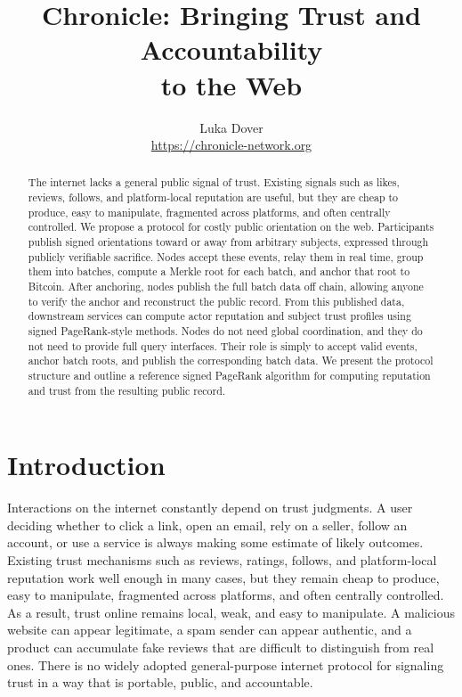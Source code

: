 \documentclass[11pt]{article}
\title{\textbf{Chronicle: Bringing Trust and Accountability\\to the Web}}
\author{Luka Dover \\
\small \url{https://chronicle-network.org}}
\date{}
\begin{document}
\maketitle

\begin{abstract}
The internet lacks a general public signal of trust. Existing signals such as likes, reviews, follows, and platform-local reputation are useful, but they are cheap to produce, easy to manipulate, fragmented across platforms, and often centrally controlled. We propose a protocol for costly public orientation on the web. Participants publish signed orientations toward or away from arbitrary subjects, expressed through publicly verifiable sacrifice. Nodes accept these events, relay them in real time, group them into batches, compute a Merkle root for each batch, and anchor that root to Bitcoin. After anchoring, nodes publish the full batch data off chain, allowing anyone to verify the anchor and reconstruct the public record. From this published data, downstream services can compute actor reputation and subject trust profiles using signed PageRank-style methods. Nodes do not need global coordination, and they do not need to provide full query interfaces. Their role is simply to accept valid events, anchor batch roots, and publish the corresponding batch data. We present the protocol structure and outline a reference signed PageRank algorithm for computing reputation and trust from the resulting public record.

\end{abstract}

\section{Introduction}

Interactions on the internet constantly depend on trust judgments. A user deciding whether to click a link, open an email, rely on a seller, follow an account, or use a service is always making some estimate of likely outcomes. Existing trust mechanisms such as reviews, ratings, follows, and platform-local reputation work well enough in many cases, but they remain cheap to produce, easy to manipulate, fragmented across platforms, and often centrally controlled. As a result, trust online remains local, weak, and easy to manipulate. A malicious website can appear legitimate, a spam sender can appear authentic, and a product can accumulate fake reviews that are difficult to distinguish from real ones. There is no widely adopted general-purpose internet protocol for signaling trust in a way that is portable, public, and accountable.
\end{document}
